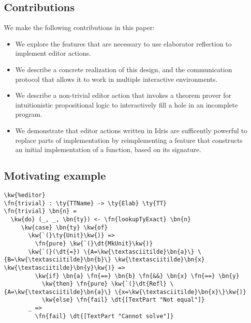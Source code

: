 \subsection*{Contributions}

We make the following contributions in this paper:
\begin{itemize}
\item We explore the features that are necessary to use
  elaborator reflection to implement editor actions.
\item We describe a concrete realization of this design, and the
  communication protocol that allows it to work in multiple
  interactive environments.
\item We describe a non-trivial editor action that invokes a
  theorem prover for intuitionistic propositional logic to
  interactively fill a hole in an incomplete
  program.
\item We demonstrate that editor actions written in Idris are
  sufficently powerful to replace parts of implementation by
  reimplementing a feature that constructs an initial implementation
  of a function, based on its signature.
\end{itemize}


\subsection{Motivating example}


\begin{Verbatim}
\kw{%editor}
\fn{trivial} : \ty{TTName} -> \ty{Elab} \ty{TT}
\fn{trivial} \bn{n} =
  \kw{do} (_, _, \bn{ty}) <- \fn{lookupTyExact} \bn{n}
     \kw{case} \bn{ty} \kw{of}
       \kw{`(}\ty{Unit}\kw{)} =>
         \fn{pure} \kw{`(}\dt{MkUnit}\kw{)}
       \kw{`(}(\dt{=}) \{A=\kw{\textasciitilde}\bn{a}\} \{B=\kw{\textasciitilde}\bn{b}\} \kw{\textasciitilde}\bn{x} \kw{\textasciitilde}\bn{y}\kw{)} =>
         \kw{if} \bn{a} \fn{==} \bn{b} \fn{&&} \bn{x} \fn{==} \bn{y}
           \kw{then} \fn{pure} \kw{`(}\dt{Refl} \{A=\kw{\textasciitilde}\bn{a}\} \{x=\kw{\textasciitilde}\bn{x}\}\kw{)}
           \kw{else} \fn{fail} \dt{[TextPart "Not equal"]}
       _ =>
         \fn{fail} \dt{[TextPart "Cannot solve"]}


\end{Verbatim}

